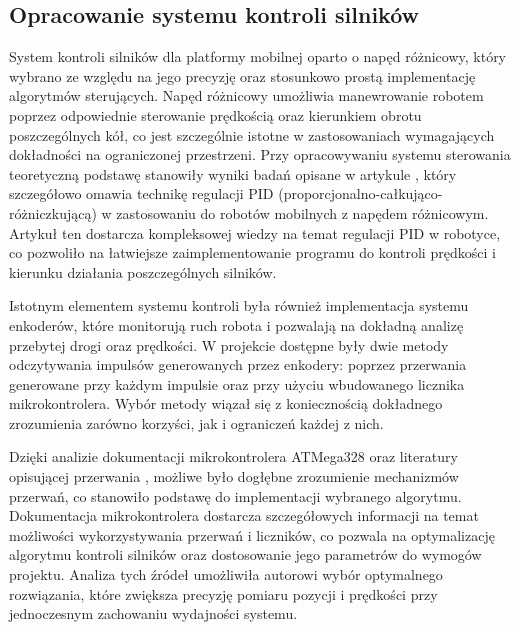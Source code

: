 \subsection{Opracowanie systemu kontroli silników}

System kontroli silników dla platformy mobilnej oparto o napęd różnicowy, który wybrano ze względu na jego precyzję oraz stosunkowo prostą implementację algorytmów sterujących. Napęd różnicowy umożliwia manewrowanie robotem poprzez odpowiednie sterowanie prędkością oraz kierunkiem obrotu poszczególnych kół, co jest szczególnie istotne w zastosowaniach wymagających dokładności na ograniczonej przestrzeni. Przy opracowywaniu systemu sterowania teoretyczną podstawę stanowiły wyniki badań opisane w artykule \cite{bib:konferencja}, który szczegółowo omawia technikę regulacji PID (proporcjonalno-całkująco-różniczkującą) w zastosowaniu do robotów mobilnych z napędem różnicowym. Artykuł ten dostarcza kompleksowej wiedzy na temat regulacji PID w robotyce, co pozwoliło na łatwiejsze zaimplementowanie programu do kontroli prędkości i kierunku działania poszczególnych silników. 

Istotnym elementem systemu kontroli była również implementacja systemu enkoderów, które monitorują ruch robota i pozwalają na dokładną analizę przebytej drogi oraz prędkości. W projekcie dostępne były dwie metody odczytywania impulsów generowanych przez enkodery: poprzez przerwania generowane przy każdym impulsie oraz przy użyciu wbudowanego licznika mikrokontrolera. Wybór metody wiązał się z koniecznością dokładnego zrozumienia zarówno korzyści, jak i ograniczeń każdej z nich.

Dzięki analizie dokumentacji mikrokontrolera ATMega328 \cite{bib:manualarduino} oraz literatury opisującej przerwania \cite{bib:artykul1}, możliwe było dogłębne zrozumienie mechanizmów przerwań, co stanowiło podstawę do implementacji wybranego algorytmu. Dokumentacja mikrokontrolera dostarcza szczegółowych informacji na temat możliwości wykorzystywania przerwań i liczników, co pozwala na optymalizację algorytmu kontroli silników oraz dostosowanie jego parametrów do wymogów projektu. Analiza tych źródeł umożliwiła autorowi wybór optymalnego rozwiązania, które zwiększa precyzję pomiaru pozycji i prędkości przy jednoczesnym zachowaniu wydajności systemu.
